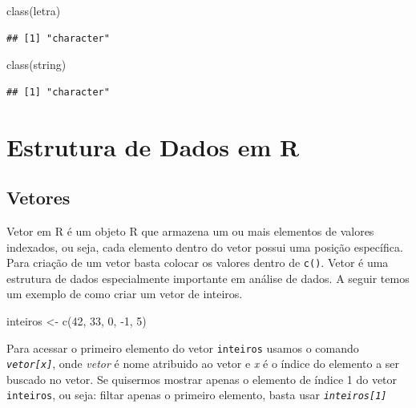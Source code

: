 \documentclass[
]{article}
\newenvironment{Shaded}{\begin{snugshade}}{\end{snugshade}}
\newcommand{\DecValTok}[1]{\textcolor[rgb]{0.00,0.00,0.81}{#1}}
\newcommand{\FunctionTok}[1]{\textcolor[rgb]{0.00,0.00,0.00}{#1}}
\newcommand{\NormalTok}[1]{#1}
\newcommand{\OtherTok}[1]{\textcolor[rgb]{0.56,0.35,0.01}{#1}}
\newcommand{\SpecialCharTok}[1]{\textcolor[rgb]{0.00,0.00,0.00}{#1}}
\begin{document}
\begin{Shaded}
\begin{Highlighting}[]
\FunctionTok{class}\NormalTok{(letra)}
\end{Highlighting}
\end{Shaded}

\begin{verbatim}
## [1] "character"
\end{verbatim}

\begin{Shaded}
\begin{Highlighting}[]
\FunctionTok{class}\NormalTok{(string)}
\end{Highlighting}
\end{Shaded}

\begin{verbatim}
## [1] "character"
\end{verbatim}

\hypertarget{estrutura-de-dados-em-r}{%
\section{Estrutura de Dados em R}\label{estrutura-de-dados-em-r}}

\hypertarget{vetores}{%
\subsection{Vetores}\label{vetores}}

Vetor em R é um objeto R que armazena um ou mais elementos de valores
indexados, ou seja, cada elemento dentro do vetor possui uma posição
específica. Para criação de um vetor basta colocar os valores dentro de
\texttt{c()}. Vetor é uma estrutura de dados especialmente importante em
análise de dados. A seguir temos um exemplo de como criar um vetor de
inteiros.

\begin{Shaded}
\begin{Highlighting}[]
\NormalTok{inteiros }\OtherTok{\textless{}{-}} \FunctionTok{c}\NormalTok{(}\DecValTok{42}\NormalTok{, }\DecValTok{33}\NormalTok{, }\DecValTok{0}\NormalTok{, }\SpecialCharTok{{-}}\DecValTok{1}\NormalTok{, }\DecValTok{5}\NormalTok{)}
\end{Highlighting}
\end{Shaded}

Para acessar o primeiro elemento do vetor \texttt{inteiros} usamos o
comando \emph{\texttt{vetor{[}x{]}}}, onde \emph{vetor} é nome atribuido
ao vetor e \emph{x} é o índice do elemento a ser buscado no vetor. Se
quisermos mostrar apenas o elemento de índice 1 do vetor
\texttt{inteiros}, ou seja: filtar apenas o primeiro elemento, basta
usar \emph{\texttt{inteiros{[}1{]}}}
\end{document}
